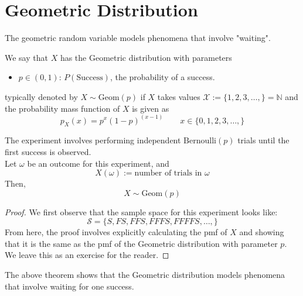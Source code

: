 \section{Geometric Distribution}
The geometric random variable models phenomena that involve "waiting". 

\begin{defn}
    We say that $X$ has the Geometric distribution with parameters
    \begin{itemize}
        \item $p\in (0,1)$: $P(\text{Success})$, the probability of a success. 
    \end{itemize}
    typically denoted by $X \sim \text{Geom}(p)$ if $X$ takes values $\mathcal{X}:= \{1, 2, 3, \dots, \} = \mathbb{N}$ and the probability mass function of $X$ is given as
    $$p_X(x) = p^x(1-p)^{(x-1)}\quad \quad x\in \{0,1, 2, 3, \dots, \}$$
\end{defn}


\begin{thm}
    The experiment involves performing independent $\text{Bernoulli}(p)$ trials until the first success is observed.  
    \\  
    Let $\omega$ be an outcome for this experiment, and $$X(\omega) := \text{number of trials in $\omega$}$$
    Then, 
    $$X \sim \text{Geom}(p)$$
\end{thm}
\begin{proof}
We first observe that the sample space for this experiment looks like:
$$ \mathcal{S} = \{S, FS, FFS, FFFS, FFFFS, \dots, \}$$
From here, the proof involves explicitly calculating the pmf of $X$ and showing that it is the same as the pmf of the Geometric distribution with parameter $p$. We leave this as an exercise for the reader. 
\end{proof}
The above theorem shows that the Geometric distribution models phenomena that involve waiting for one success. 

